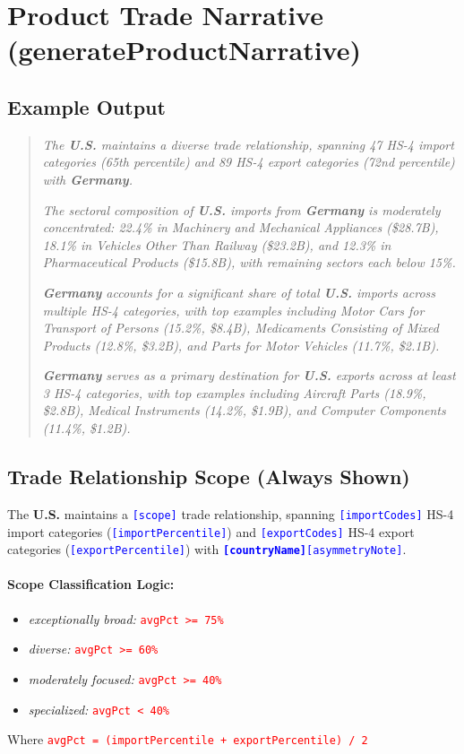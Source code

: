 \documentclass[12pt]{article}
\newcommand{\var}[1]{\textcolor{blue}{\texttt{[#1]}}}
\newcommand{\bold}[1]{\textbf{#1}}
\newcommand{\cond}[1]{\textcolor{red}{\texttt{#1}}}
\begin{document}
\section{Product Trade Narrative (generateProductNarrative)}

\subsection{Example Output}
\begin{quote}
\textit{The \textbf{U.S.} maintains a diverse trade relationship, spanning 47 HS-4 import categories (65th percentile) and 89 HS-4 export categories (72nd percentile) with \textbf{Germany}.}

\textit{The sectoral composition of \textbf{U.S.} imports from \textbf{Germany} is moderately concentrated: 22.4\% in Machinery and Mechanical Appliances (\$28.7B), 18.1\% in Vehicles Other Than Railway (\$23.2B), and 12.3\% in Pharmaceutical Products (\$15.8B), with remaining sectors each below 15\%.}

\textit{\textbf{Germany} accounts for a significant share of total \textbf{U.S.} imports across multiple HS-4 categories, with top examples including Motor Cars for Transport of Persons (15.2\%, \$8.4B), Medicaments Consisting of Mixed Products (12.8\%, \$3.2B), and Parts for Motor Vehicles (11.7\%, \$2.1B).}

\textit{\textbf{Germany} serves as a primary destination for \textbf{U.S.} exports across at least 3 HS-4 categories, with top examples including Aircraft Parts (18.9\%, \$2.8B), Medical Instruments (14.2\%, \$1.9B), and Computer Components (11.4\%, \$1.2B).}
\end{quote}

\subsection{Trade Relationship Scope (Always Shown)}
The \bold{U.S.} maintains a \var{scope} trade relationship, spanning \var{importCodes} HS-4 import categories (\var{importPercentile}) and \var{exportCodes} HS-4 export categories (\var{exportPercentile}) with \bold{\var{countryName}}\var{asymmetryNote}.

\paragraph{Scope Classification Logic:}
\begin{itemize}[noitemsep]
\item \textit{exceptionally broad:} \cond{avgPct >= 75\%}
\item \textit{diverse:} \cond{avgPct >= 60\%}
\item \textit{moderately focused:} \cond{avgPct >= 40\%}
\item \textit{specialized:} \cond{avgPct < 40\%}
\end{itemize}
Where \cond{avgPct = (importPercentile + exportPercentile) / 2}
\end{document}
